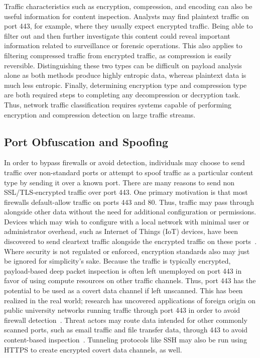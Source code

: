 Traffic characteristics such as encryption, compression, and encoding can also be useful information for content inspection. Analysts may find plaintext traffic on port 443, for example, where they usually expect encrypted traffic. Being able to filter out and then further investigate this content could reveal important information related to surveillance or forensic operations. This also applies to filtering compressed traffic from encrypted traffic, as compression is easily reversible. Distinguishing these two types can be difficult on payload analysis alone as both methods produce highly entropic data, whereas plaintext data is much less entropic. Finally, determining encryption type and compression type are both required steps to completing any decompression or decryption task. Thus, network traffic classification requires systems capable of performing encryption and compression detection on large traffic streams.

\subsection{Port Obfuscation and Spoofing}

In order to bypass firewalls or avoid detection, individuals may choose to send traffic over non-standard ports or attempt to spoof traffic as a particular content type by sending it over a known port. There are many reasons to send non SSL/TLS-encrypted traffic over port 443. One primary motivation is that most firewalls default-allow traffic on ports 443 and 80. Thus, traffic may pass through alongside other data without the need for additional configuration or permissions. Devices which may wish to configure with a local network with minimal user or administrator overhead, such as Internet of Things (IoT) devices, have been discovered to send cleartext traffic alongside the encrypted traffic on these ports~\cite{wood2017cleartext}. Where security is not regulated or enforced, encryption standards also may just be ignored for simplicity's sake. Because the traffic is typically encrypted, payload-based deep packet inspection is often left unemployed on port 443 in favor of using compute resources on other traffic channels. Thus, port 443 has the potential to be used as a covert data channel if left unscanned. This has been realized in the real world; research has uncovered applications of foreign origin on public university networks running traffic through port 443 in order to avoid firewall detection~\cite{alcock2016sneaking}. Threat actors may route data intended for other commonly scanned ports, such as email traffic and file transfer data, through 443 to avoid content-based inspection~\cite{paya2009inspecting, lifliand2013encrypted, zander2005automated}. Tunneling protocols like SSH may also be run using HTTPS to create encrypted covert data channels, as well.
